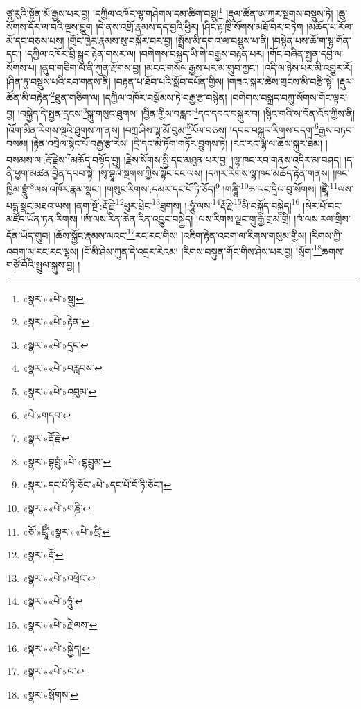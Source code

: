 ཙཱ་རུའི་སྟོན་མོ་རྒྱས་པར་བྱ། །དཀྱིལ་འཁོར་ལྷ་གཤེགས་དམ་ཚིག་བསྡུ།\footnote{«སྣར་»«པེ་»སྡུ།} །རྡུལ་ཚོན་ཨ་ཀཱར་སྔགས་བསྡུས་ཏེ། །ཆུ་སོགས་དོར་ལ་བའི་ལྔས་བྱུག །དེ་ནས་འགྲོ་རྣམས་དད་བྱའི་ཕྱིར། །ཤིང་རྟ་ཁྲི་སོགས་མཐོ་བར་བཏེག །མཆོད་པ་རོལ་མོ་དང་བཅས་པས། །གྲོང་ཁྱེར་རྣམས་སུ་བསྐོར་བར་བྱ། །སྤྲོས་མི་དགའ་ལ་བསྡུས་པ་ནི། །བསྙེན་པས་ཆོ་ག་སྟ་གོན་དང་། །དཀྱིལ་འཁོར་བྲི་སྒྲུབ་རྟེན་གསར་ལ། །བགེགས་བསྐྲད་ཡི་གེ་བརྒྱས་བརྟན་པར། །གོང་བཞིན་སྤྱན་དབྱེ་ལ་སོགས་པ། །ནུབ་གཅིག་ལ་ནི་ཀུན་རྫོགས་བྱ། །མངའ་གསོལ་རྒྱས་པར་མ་གྲུབ་ཀྱང་། །འདི་ལ་ཉེས་པར་མི་འགྱུར་རོ། །ཤིན་ཏུ་བསྡུས་པའི་རབ་གནས་ནི། །བརྟན་པ་ཐོབ་པའི་སློབ་དཔོན་གྱིས། །གཟའ་སྐར་ཚེས་གྲངས་མི་བརྩི་སྟེ། །རྡུལ་ཚོན་མི་བརྟེན་\footnote{«སྣར་»«པེ་»རྟེན་}ཐུན་གཅིག་ལ། །དཀྱིལ་འཁོར་བསྒོམས་ཏེ་བརྒྱ་རྩ་བསྙེན། །བགེགས་བསྐྲད་བཀྲུ་སོགས་གོང་ལྟར་བྱ། །བསྐྱེད་དེ་སྤྱན་དྲངས་\footnote{«སྣར་»«པེ་»དྲང་}སྐུ་གསུང་ཐུགས། །བྱིན་གྱིས་བརླབ་\footnote{«སྣར་»«པེ་»བརླབས་}དང་དབང་བསྐུར་བ། །སྙིང་གའི་ས་བོན་འོད་ཀྱིས་ནི། །འོག་མིན་རིགས་ལྔའི་ཐུགས་ཀ་ནས། །བཀྲ་ཤིས་ལྷ་མོ་བུམ་\footnote{«སྣར་»«པེ་»འབུམ་}རོལ་བཅས། །དབང་བསྐུར་རིགས་བདག་\footnote{«པེ་»གདབ་}རྒྱས་བཏབ་བསམ། །རྟེན་འབྲེལ་སྙིང་པོ་བརྒྱ་རྩ་རེས། །དྲི་དང་མེ་ཏོག་གཏོར་བྱུགས་ཏེ། །རང་རང་ལྷ་ལ་ཆོས་སྐུར་ཐིམ། །བསམས་ལ་:རྡོ་རྗེས་\footnote{«སྣར་»རྡོ་རྗེ་}མཆོད་བསྟོད་བྱ། །རྗེས་སོགས་སྤྱི་དང་མཐུན་པར་བྱ། །ལྷ་ཁང་རབ་གནས་འདིར་མ་བཤད། །ད་ནི་ཕྱག་མཚན་བྱིན་དབབ་སྟེ། །སྭ་བྷཱའི་སྔགས་ཀྱིས་སྟོང་ངང་ལས། །དཀར་རིགས་ལྷ་ཁང་མཆོད་རྟེན་གནས། །ཁང་ཁྱིམ་བྷྲཱུཾ་\footnote{«སྣར་»བྷབྲུཾ་«པེ་»བྷབྲུམ་}ལས་འཁོར་རྣམ་སྣང་། །གསུང་རིགས་:དམར་དང་པོ་ཏི་ཅོད།\footnote{«སྣར་»དང་པོ་ཏི་ཅོང་«པེ་»དང་པོ་བོ་ཏི་ཅོང་།} །གཎྜཱི་\footnote{«སྣར་»«པེ་»གཎྜི་}ཆ་ལང་དྲིལ་བུ་སོགས། །ཛྲཱྀཾ་\footnote{«ཅོ་»ཛྲཱིཾ་«སྣར་»«པེ་»ཛྲི་}ལས་པདྨ་སྣང་མཐའ་ཡས། །ནག་སྔོ་:རྡོ་རྗེ་\footnote{«སྣར་»རྡོ་}ཕུར་ཕྲེང་\footnote{«སྣར་»«པེ་»འཕྲེང་}ཐུགས། །:ཧཱུཾ་ལས་\footnote{«སྣར་»«པེ་»ཧཱུཾ་}རྡོ་རྗེ་\footnote{«སྣར་»«པེ་»རྗེ་ལས་}མི་བསྐྱོད་བསྐྱེད།\footnote{«སྣར་»«པེ་»སྐྱེད།} །སེར་པོ་བང་མཛོད་ཡོན་ཏན་རིགས། །ཨཾ་ལས་རིན་ཆེན་རིན་འབྱུང་བསྐྱེད། །ལས་རིགས་ལྗང་གུ་རྒྱ་གྲམ་གྲི། །ཁཾ་ལས་རལ་གྲིས་དོན་ཡོད་གྲུབ། །ཆོས་སྐྱོང་རྣམས་ལའང་\footnote{«སྣར་»«པེ་»ལ་}རང་རང་གིས། །འཇིག་རྟེན་འབག་ལ་རིགས་གསུམ་གྱིས། །རིགས་ཀྱི་འབག་ལ་རང་རང་ལྷས། །ངོ་མི་ཤེས་ཀུན་དེ་འདྲར་རེའམ། །རིགས་བསྟུན་གོང་གིས་ཤེས་པར་བྱ། །སྲོག་\footnote{«སྣར་»སྲོགས་}ཆགས་གཙོ་བོའི་སྤྲུལ་སྐུས་བྱ། །
